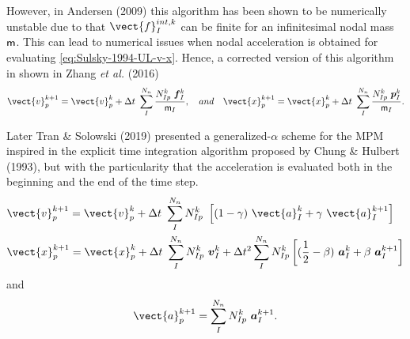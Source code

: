 However, in Andersen (2009)\cite{thesis_Andersen_2009} this
algorithm has been shown to be numerically unstable due to that
$\vect{f}_I^{int,k}$ can be finite for an infinitesimal nodal mass
$\mathsf{m}$. This can lead to numerical issues when nodal acceleration
is obtained for evaluating \eqref{eq:Sulsky-1994-UL-v-x}. Hence, a
corrected version of this algorithm in shown in Zhang {\it et al.}
(2016)\cite{Zhang_book_2016}
\begin{equation}
  \label{eq:Zhang-2016-UL-v-x}
  \vect{v}_p^{k+1} = \vect{v}_p^{k} + \Delta t\
  \sum^{N_n}_{I}\frac{N_{Ip}^{k}\ \vec{f}_{I}^{k}}{\tens{m}_I},\quad and\quad
  \vect{x}_p^{k+1} = \vect{x}_p^{k} + \Delta t\ \sum^{N_n}_{I} \frac{N_{Ip}^{k}\ \vec{p}_{I}^{k}}{\tens{m}_I}.  
\end{equation}

Later Tran \& Solowski (2019)\cite{Tran2019e} presented a
generalized-$\alpha$ scheme for the MPM inspired in the explicit time
integration algorithm proposed by Chung \& Hulbert
(1993)\cite{Geranlized_alpha_1993}, but with the particularity that
the acceleration is evaluated both in the beginning and the end of the
time step.
\begin{align}
  \label{eq:Tran-2019-GA-v}
  & \vect{v}_p^{k+1} = \vect{v}_p^{k} + \Delta t\
    \sum^{N_n}_{I} N_{Ip}^{k}\ \left[(1 - \gamma)\ \vect{a}_I^{k} +
    \gamma\ \vect{a}_I^{k+1} \right]\\
  \label{eq:Tran-2019-GA-x}
  & \vect{x}_p^{k+1} = \vect{x}_p^{k} + \Delta t\
    \sum^{N_n}_{I}N_{Ip}^{k}\ \vec{v}_{I}^{k} + \Delta t^2
    \sum^{N_n}_{I}N_{Ip}^{k} \left[ (\frac{1}{2} - \beta)\
    \vec{a}_{I}^{k} + \beta\ \vec{a}_{I}^{k+1} \right]
\end{align}
and
\begin{equation}
  \label{eq:Tran-2019-GA-a}
   \vect{a}_p^{k+1} = \sum^{N_n}_{I}N_{Ip}^{k}\ \vec{a}_{I}^{k+1}.
\end{equation}

